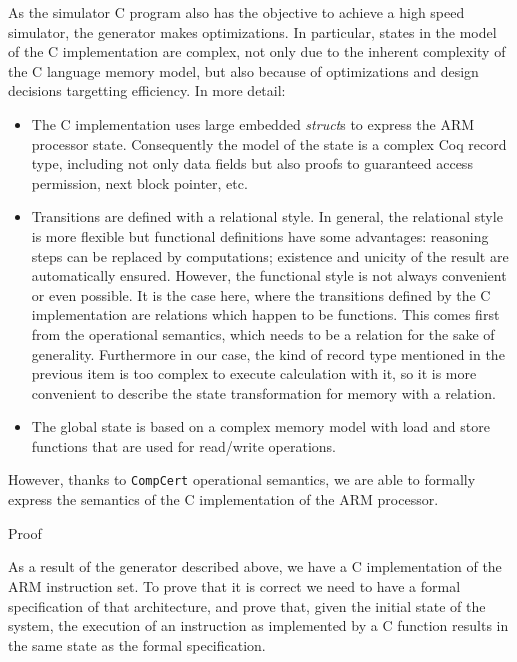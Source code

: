 \documentclass[twocolumn]{article}
\makeatletter
\def\subsection{\@startsection {subsection}{2}{\z@}{16pt plus 2pt minus 2pt}
{6pt plus 2pt minus 2pt}{\normalsize\sl
\edef\@svsec{\thesubsection.\ }}}
\def\thesubsection{\Alph{subsection}}
\newcommand{\compcert}{\texttt{CompCert}\xspace}
\makeatother
\begin{document}
As the simulator C program also has the objective to achieve a high
speed simulator, the generator makes optimizations. In particular,
states in the model of the C implementation are complex, not only due
to the inherent complexity of the C language memory model, but also
because of optimizations and design decisions targetting efficiency.
In more detail:
\begin{itemize}
\item The C implementation uses large embedded \emph{struct}s to
  express the ARM processor state.  Consequently the model of the
  state is a complex Coq record type, including not only data fields
  but also proofs to guaranteed access permission, next block pointer,
  etc.
\item Transitions are defined with a relational style.  In general,
  the relational style is more flexible but functional definitions
  have some advantages: reasoning steps can be replaced by
  computations; existence and unicity of the result are automatically
  ensured.  However, the functional style is not always convenient or
  even possible.  It is the case here, where the transitions defined
  by the C implementation are relations which happen to be functions.
  This comes first from the operational semantics, which needs to be
  a relation for the sake of generality.  Furthermore in our case, the
  kind of record type mentioned in the previous item is too complex to
  execute calculation with it, so it is more convenient to describe
  the state transformation for memory with a relation.
\item The global state is based on a complex memory model with load
  and store functions that are used for read/write operations.
\end{itemize}

However, thanks to \compcert operational semantics, we are able to
formally express the semantics of the C implementation of the ARM
processor.

\subsection{Proof}

As a result of the generator described above, we have a C
implementation of the ARM instruction set.  To prove that it is
correct we need to have a formal specification of that architecture,
and prove that, given the initial state of the system, the execution
of an instruction as implemented by a C function results in the same
state as the formal specification.
\end{document}
